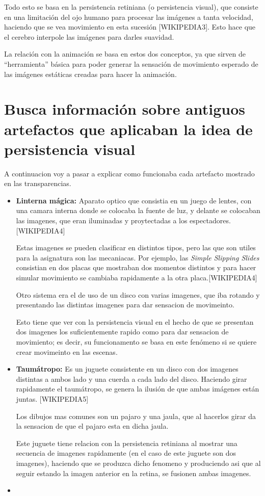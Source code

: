 \documentclass{article}
\begin{document}
\bigskip

Todo esto se basa en la persistencia retiniana (o persistencia visual), que consiste en una limitación del ojo humano para procesar las imágenes a tanta velocidad, haciendo que se vea movimiento en esta sucesión [WIKIPEDIA3]. Esto hace que el cerebro interpole las imágenes para darles suavidad.

\bigskip

La relación con la animación se basa en estos dos conceptos, ya que sirven de ``herramienta'' básica para poder generar la sensación de movimiento esperado de las imágenes estáticas creadas para hacer la animación. 


\section{Busca información sobre antiguos artefactos que aplicaban la idea de persistencia visual}

A continuacion voy a pasar a explicar como funcionaba cada artefacto mostrado en las transparencias.

\begin{itemize}
    \item \textbf{Linterna mágica: }Aparato optico que consistia en un juego de lentes, con una camara interna donde se colocaba la fuente de luz, y delante se colocaban las imagenes, que eran iluminadas y proytectadas a los espectadores. [WIKIPEDIA4] 
    
    Estas imagenes se pueden clasificar en distintos tipos, pero las que son utiles para la asignatura son las mecaniacas. Por ejemplo, las \textit{Simple Slipping Slides} consistian en dos placas que mostraban dos momentos distintos y para hacer simular movimiento se cambiaba rapidamente a la otra placa.[WIKIPEDIA4]

    Otro sistema era el de uso de un disco con varias imagenes, que iba rotando y presentando las distintas imagenes para dar sensacion de movimeinto.

    Esto tiene que ver con la persistencia visual en el hecho de que se presentan dos imagenes los suficientemente rapido como para dar sensacion de movimiento; es decir, su funcionamento se basa en este fenómeno si se quiere crear movimeinto en las escenas.

    \item \textbf{Taumátropo: }Es un juguete consistente en un disco con dos imagenes distintas a ambos lado y una cuerda a cada lado del disco. Haciendo girar rapidamente el taumátropo, se genera la ilusión de que ambas imágenes están juntas. [WIKIPEDIA5]
    
    Los dibujos mas comunes son un pajaro y una jaula, que al hacerlos girar da la sensacion de que el pajaro esta en dicha jaula.

    Este juguete tiene relacion con la persistencia retiniana al mostrar una secuencia de imagenes rapidamente (en el caso de este juguete son dos imagenes), haciendo que se produzca dicho fenomeno y produciendo asi que al seguir estando la imagen anterior en la retina, se fusionen ambas imagenes.

    \item 
\end{itemize}
\end{document}
